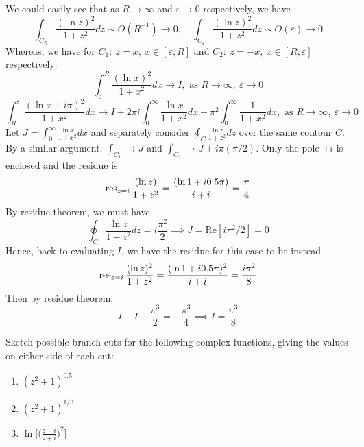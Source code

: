 \documentclass[a4paper]{article}
\begin{document}
\begin{ans}
\begin{enumerate}[label=(\roman*)]
\begin{center}
  \end{center}
We could easily see that as $R\rightarrow\infty$ and $\varepsilon\rightarrow 0$ respectively, we have
$$\int_{C_R}\frac{(\ln z)^2}{1+z^2}dz\sim O(R^{-1})\rightarrow 0,\quad \int_{C_{\varepsilon}}\frac{(\ln z)^2}{1+z^2}dz\sim O(\varepsilon)\rightarrow 0$$
Whereas, we have for $C_1:~z=x,~x\in[\varepsilon,R]$ and $C_2:~z=-x,~x\in[R,\varepsilon]$ respectively: 
$$\int_{\varepsilon}^R\frac{(\ln x)^2}{1+x^2}dx\rightarrow I,\text{ as } R\rightarrow\infty,~\varepsilon\rightarrow 0$$
$$\int^{\varepsilon}_R\frac{(\ln x+i\pi)^2}{1+x^2}dx\rightarrow I+2\pi i\int_0^\infty\frac{\ln x}{1+x^2}dx-\pi^2\int_0^\infty\frac{1}{1+x^2}dx,\text{ as } R\rightarrow\infty,~\varepsilon\rightarrow 0$$
Let $J=\int_0^\infty\frac{\ln x}{1+x^2}dx$ and separately consider $\oint_C\frac{\ln z}{1+z^2}dz$ over the same contour $C$. By a similar argument, $\int_{C_1}\rightarrow J$ and $\int_{C_2}\rightarrow J+i\pi(\pi/2)$. Only the pole $+i$ is enclosed and the residue is
$$\operatorname{res}_{z=i}\frac{(\ln z)}{1+z^2}=\frac{(\ln 1+i0.5\pi)}{i+i}=\frac{\pi}{4}$$
By residue theorem, we must have
$$\oint_C\frac{\ln z}{1+z^2}dz=i\frac{\pi^2}{2}\implies J=\text{Re}[i\pi^2/2]=0$$
Hence, back to evaluating $I$, we have the residue for this case to be instead
$$\operatorname{res}_{z=i}\frac{(\ln z)^2}{1+z^2}=\frac{(\ln 1+i0.5\pi)^2}{i+i}=\frac{i\pi^2}{8}$$
Then by residue theorem,
$$I+I-\frac{\pi^3}{2}=-\frac{\pi^3}{4}\implies I=\frac{\pi^3}{8}$$
\end{enumerate}
\end{ans}
\newpage
\begin{qns}
Sketch possible branch cuts for the following complex functions, giving the values on either side of each cut:
\begin{enumerate}[label=(\roman*)]
    \item $(z^2+1)^{0.5}$
    \item $(z^2+1)^{1/3}$
    \item $\ln\bigg[\bigg(\frac{z-i}{z+i}\bigg)^2\bigg]$
\end{enumerate}
\end{qns}
\end{document}
